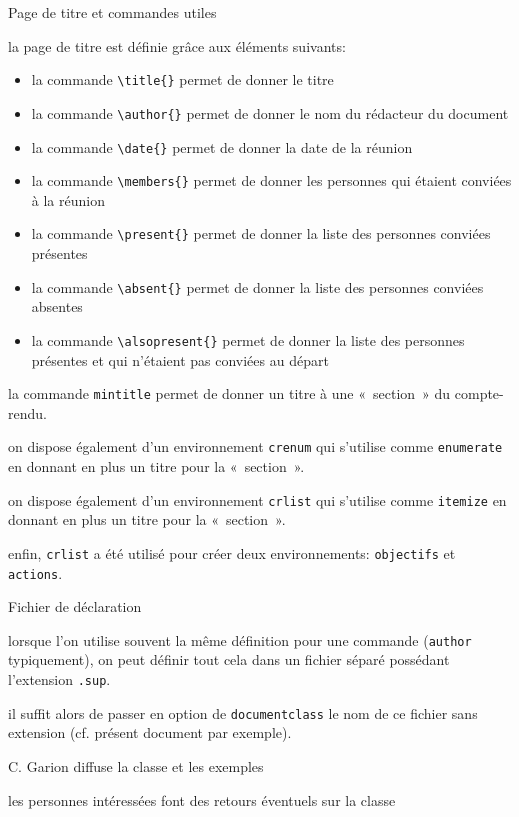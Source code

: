 \documentclass[cr]{supaero-mins}
\begin{document}
\begin{crlist}{Page de titre et commandes utiles}
\item la page de titre est définie grâce aux éléments suivants:

  \begin{itemize}
  \item la commande \verb!\title{}! permet de donner le titre
  \item la commande \verb!\author{}! permet de donner le nom du
    rédacteur du document
  \item la commande \verb!\date{}! permet de donner la date de la
    réunion
  \item la commande \verb!\members{}! permet de donner les personnes
    qui étaient conviées à la réunion
  \item la commande \verb!\present{}! permet de donner la liste des
    personnes conviées présentes
  \item la commande \verb!\absent{}! permet de donner la liste des
    personnes conviées absentes
  \item la commande \verb!\alsopresent{}! permet de donner la liste
    des personnes présentes et qui n'étaient pas conviées au départ
  \end{itemize}

\item la commande \verb!mintitle! permet de donner un titre à une
  «~section~» du compte-rendu.
\item on dispose également d'un environnement \verb!crenum! qui
  s'utilise comme \verb!enumerate! en donnant en plus un titre pour la
  «~section~».
\item on dispose également d'un environnement \verb!crlist! qui
  s'utilise comme \verb!itemize! en donnant en plus un titre pour la
  «~section~».
\item enfin, \verb!crlist! a été utilisé pour créer deux
  environnements: \verb!objectifs! et \verb!actions!.
\end{crlist}

\begin{crlist}{Fichier de déclaration}
\item lorsque l'on utilise souvent la même définition pour une
  commande (\verb!author! typiquement), on peut définir tout cela dans
  un fichier séparé possédant l'extension \verb!.sup!.
\item il suffit alors de passer en option de \verb!documentclass! le
  nom de ce fichier sans extension (cf. présent document par exemple).
\end{crlist}







\begin{actions}
\item C. Garion diffuse la classe et les exemples
\item les personnes intéressées font des retours éventuels sur la
  classe
\end{actions}
\end{document}
